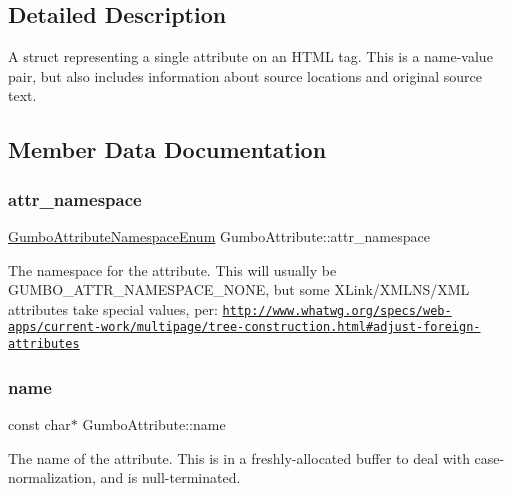 \subsection{Detailed Description}
A struct representing a single attribute on an H\+T\+ML tag. This is a name-\/value pair, but also includes information about source locations and original source text. 

\subsection{Member Data Documentation}
\mbox{\label{struct_gumbo_attribute_a8393cdc691835a7aa3ffb8179969d8bf}} 
\subsubsection{\texorpdfstring{attr\+\_\+namespace}{attr\_namespace}}
{\footnotesize\ttfamily \mbox{\hyperlink{gumbo_8h_a030699170924efadb11b8e43a8681852}{Gumbo\+Attribute\+Namespace\+Enum}} Gumbo\+Attribute\+::attr\+\_\+namespace}

The namespace for the attribute. This will usually be G\+U\+M\+B\+O\+\_\+\+A\+T\+T\+R\+\_\+\+N\+A\+M\+E\+S\+P\+A\+C\+E\+\_\+\+N\+O\+NE, but some X\+Link/\+X\+M\+L\+N\+S/\+X\+ML attributes take special values, per\+: \href{http://www.whatwg.org/specs/web-apps/current-work/multipage/tree-construction.html#adjust-foreign-attributes}{\tt http\+://www.\+whatwg.\+org/specs/web-\/apps/current-\/work/multipage/tree-\/construction.\+html\#adjust-\/foreign-\/attributes} \mbox{\label{struct_gumbo_attribute_acafedb3e0f96b0fc51ea656ff949f05b}} 
\subsubsection{\texorpdfstring{name}{name}}
{\footnotesize\ttfamily const char$\ast$ Gumbo\+Attribute\+::name}

The name of the attribute. This is in a freshly-\/allocated buffer to deal with case-\/normalization, and is null-\/terminated. \mbox{\label{struct_gumbo_attribute_a1cdfab1070ba0b3c584317a4d2cb8a0b}} 
